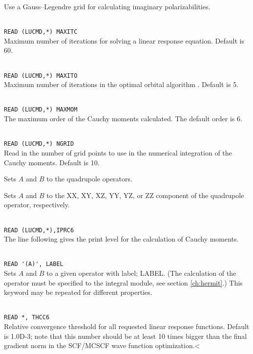 \begin{description}
\item{} Use a Gauss--Legendre grid for calculating imaginary polarizabilities.

\item{}\\
\verb|READ (LUCMD,*) MAXITC|\\
Maximum number of iterations for solving a linear response 
equation. Default is 60.

\item{}\\
\verb|READ (LUCMD,*) MAXITO|\\
Maximum number of iterations in the optimal orbital
algorithm
\cite{tuhjahjajpjjcp84}. 
Default is 5.

\item{}\\
\verb|READ (LUCMD,*) MAXMOM|\\
The maximum order of the Cauchy moments calculated. The default order is 6.

\item{}\\
\verb|READ (LUCMD,*) NGRID|\\
Read in the number of grid points to use in the numerical integration of the Cauchy moments. Default is 10.

\item{}
Sets $A$ and $B$ to the quadrupole operators.

\item{}
Sets $A$ and $B$ to the XX, XY, XZ, YY, YZ, or ZZ component of the
quadrupole operator, respectively.

\item{}     \\
\verb|READ (LUCMD,*),IPRC6 |\\
   The line following gives the print level for the calculation of Cauchy moments.

\item{}\\
\verb|READ '(A)', LABEL|\\
Sets $A$ and $B$ to a given operator with label; LABEL.
(The calculation of the operator must be specified to the integral
module, see section \ref{ch:hermit}.)
This keyword may be repeated for different properties.

\item{}\\
\verb|READ *, THCC6|\\
Relative convergence threshold for all requested linear response functions.
Default is 1.0D-3; note that this number should be at least 10 times
bigger than the final gradient norm in the SCF/MCSCF
wave function optimization.<
\end{description}


